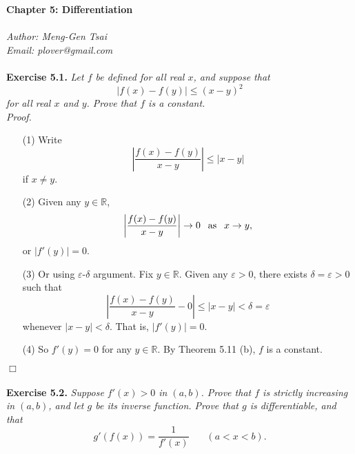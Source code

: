\documentclass{article}
\begin{document}
\textbf{\Large Chapter 5: Differentiation} \\\\



\emph{Author: Meng-Gen Tsai} \\
\emph{Email: plover@gmail.com} \\\\






\textbf{Exercise 5.1.}
\emph{Let $f$ be defined for all real $x$, and suppose that
$$|f(x) - f(y)| \leq (x - y)^2$$
for all real $x$ and $y$. Prove that $f$ is a constant.} \\

\emph{Proof.}
\begin{enumerate}
\item[(1)]
Write
\[
  \left| \frac{f(x) - f(y)}{x - y} \right| \leq |x - y|
\]
if $x \neq y$.

\item[(2)]
Given any $y \in \mathbb{R}$,
\[
  \abs{ \frac{f(x) - f(y)}{x - y} } \to 0 \:\: \text{ as } \:\: x \to y,
\]
or $|f'(y)| = 0$.

\item[(3)]
Or using $\varepsilon$-$\delta$ argument. Fix $y \in \mathbb{R}$.
Given any $\varepsilon > 0$, there exists $\delta = \varepsilon > 0$ such that
$$\left| \frac{f(x) - f(y)}{x - y} - 0 \right| \leq |x - y| < \delta = \varepsilon$$
whenever $|x - y| < \delta$. That is, $|f'(y)| = 0$.

\item[(4)]
So $f'(y) = 0$ for any $y \in \mathbb{R}$.
By Theorem 5.11 (b), $f$ is a constant.
\end{enumerate}
$\Box$ \\\\






\textbf{Exercise 5.2.}
\emph{Suppose $f'(x)>0$ in $(a,b)$.
Prove that $f$ is strictly increasing in $(a,b)$, and let $g$ be its inverse function.
Prove that $g$ is differentiable, and that
\[
  g'(f(x)) = \frac{1}{f'(x)} \:\:\:\:\:\:\:\: (a<x<b).
\]}
\end{document}
